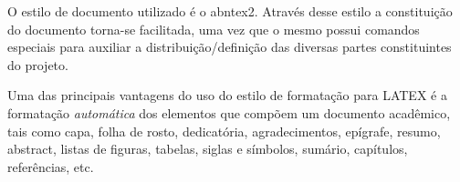 O estilo de documento utilizado é o {\ttfamily abntex2}. Através desse estilo a constituição do documento torna-se facilitada, uma vez que o mesmo possui comandos especiais para auxiliar a distribuição/definição das diversas partes constituintes do projeto. 


Uma das principais vantagens do uso do estilo de formatação para LATEX é a formatação \textit{automática} dos elementos que compõem um documento acadêmico, tais como capa, folha de rosto, dedicatória, agradecimentos, epígrafe, resumo, abstract, listas de figuras, tabelas, siglas e símbolos, sumário, capítulos, referências, etc.
